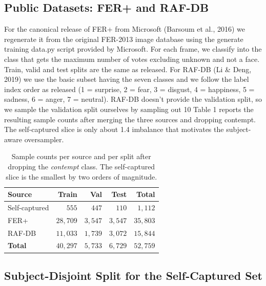 \documentclass[12pt,a4paper]{article}
\begin{document}
\subsection{Public Datasets: FER+ and RAF-DB}
\label{sec:data:public}

For the canonical release of FER+ from Microsoft (Barsoum et al., 2016) we regenerate it from the original FER-2013 image database using the generate training data.py script provided by Microsoft. For each frame, we classify into the class that gets the maximum number of votes excluding unknown and not a face. Train, valid and test splits are the same as released.
For RAF-DB (Li & Deng, 2019) we use the basic subset having the seven classes and we follow the label index order as released (1 = surprise, 2 = fear, 3 = disgust, 4 = happiness, 5 = sadness, 6 = anger, 7 = neutral). RAF-DB doesn't provide the validation split, so we sample the validation split ourselves by sampling out 10%
Table 1 reports the resulting sample counts after merging the three sources and dropping
contempt. The self-captured slice is only about 1.4%
imbalance that motivates the subject-aware oversampler.

\begin{table}[H]
  \centering
  \footnotesize
  \begin{tabular}{lrrrr}
    \toprule
    Source & Train & Val & Test & Total \\
    \midrule
    Self-captured & $555$  & $447$  & $110$  & $1{,}112$ \\
    FER+          & $28{,}709$ & $3{,}547$ & $3{,}547$ & $35{,}803$ \\
    RAF-DB        & $11{,}033$ & $1{,}739$ & $3{,}072$ & $15{,}844$ \\
    \midrule
    \textbf{Total} & $40{,}297$ & $5{,}733$ & $6{,}729$ & $52{,}759$ \\
    \bottomrule
  \end{tabular}
  \caption{Sample counts per source and per split after dropping
  the \emph{contempt} class. The self-captured slice is the
  smallest by two orders of magnitude.}
  \label{tab:datasummary}
\end{table}

\subsection{Subject-Disjoint Split for the Self-Captured Set}
\label{sec:data:split}
\end{document}
